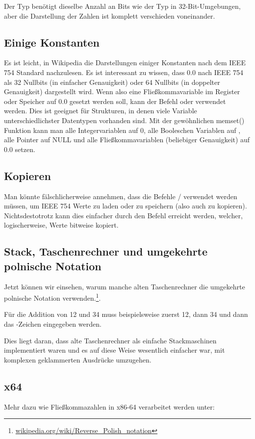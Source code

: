 Der \Tfloat Typ benötigt dieselbe Anzahl an Bits wie der \Tint Typ in
32-Bit-Umgebungen, aber die Darstellung der Zahlen ist komplett verschieden
voneinander.





\subsection{Einige Konstanten}
Es ist leicht, in Wikipedia die Darstellungen einiger Konstanten nach dem IEEE
754 Standard nachzulesen. Es ist interessant zu wissen, dass 0.0 nach IEEE 754
als 32 Nullbits (in einfacher Genauigkeit) oder 64 Nullbits (in doppelter
Genauigkeit) dargestellt wird.
Wenn also eine Fließkommavariable im Register oder Speicher auf 0.0 gesetzt
werden soll, kann der Befehl \MOV oder  verwendet werden.
Dies ist geeignet für Strukturen, in denen viele Variable unterschiedlichster
Datentypen vorhanden sind. Mit der gewöhnlichen memset() Funktion kann man alle
Integervariablen auf 0, alle Booleschen Variablen auf , alle Pointer
auf NULL und alle Fließkommavariablen (beliebiger Genauigkeit) auf 0.0 setzen.

\subsection{Kopieren}
Man könnte fälschlicherweise annehmen, dass die Befehle /
verwendet werden müssen, um IEEE 754 Werte zu laden oder zu speichern (also
auch zu kopieren). Nichtsdestotrotz kann dies einfacher durch den Befehl
 erreicht werden, welcher, logischerweise, Werte bitweise kopiert.

\subsection{Stack, Taschenrechner und umgekehrte polnische Notation}

Jetzt können wir einsehen, warum manche alten Taschenrechner die umgekehrte
polnische Notation verwenden.\footnote{\href{http://go.yurichev.com/17354}{wikipedia.org/wiki/Reverse\_Polish\_notation}}.

Für die Addition von 12 und 34 muss beispielsweise zuerst 12, dann 34 und dann
das -Zeichen eingegeben werden. 

Dies liegt daran, dass alte Taschenrechner als einfache Stackmaschinen
implementiert waren und es auf diese Weise wesentlich einfacher war, mit
komplexen geklammerten Ausdrücke umzugehen.

\subsection{x64}
Mehr dazu wie Fließkommazahlen in x86-64 verarbeitet werden unter:


